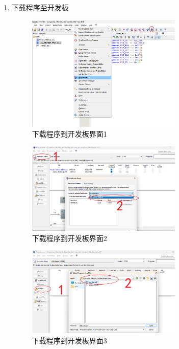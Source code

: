 \documentclass[UTF8]{article}
\theoremstyle{MyLineTheoremStyle} %
\theoremstyle{MyBlockTheoremStyle} %
\theoremstyle{MySubsubsectionStyle} %
\begin{document}
\begin{enumerate}
    \item 下载程序至开发板
    \begin{figure}[H]
        \centering
        \includegraphics[width=0.7\textwidth]{step9.png}
        \caption{下载程序到开发板界面1}
        \label{fig:step9}
    \end{figure}

    \begin{figure}[H]
        \centering
        \includegraphics[width=0.7\textwidth]{step9_2.png}
        \caption{下载程序到开发板界面2}
        \label{fig:step9_2}
    \end{figure}

    \begin{figure}[H]
        \centering
        \includegraphics[width=0.7\textwidth]{step9_3.png}
        \caption{下载程序到开发板界面3}
        \label{fig:step9_3}
    \end{figure}


\end{enumerate}
\end{document}
